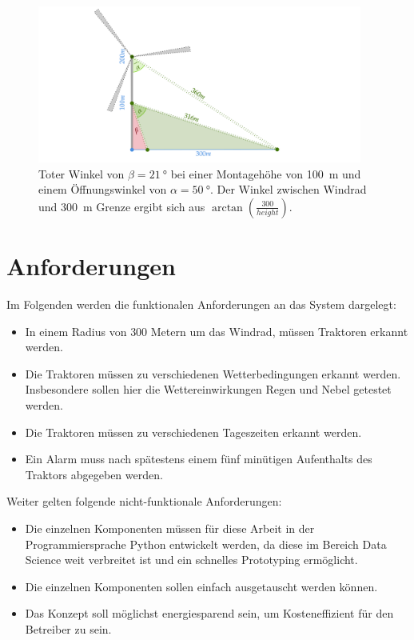 \begin{figure}[ht]
    \begin{small}
        \begin{center}
            \includegraphics[width=0.95\textwidth]{figures/camera/vertical.png}
        \end{center}
        \caption[Toter Winkel bei verschiedenen Montagehöhen]{Toter Winkel von $\beta = \SI{21}{\degree}$ bei einer Montagehöhe von \SI{100}{\metre} und einem Öffnungswinkel von $\alpha = \SI{50}{\degree}$.
        Der Winkel zwischen Windrad und \SI{300}{\metre} Grenze ergibt sich aus $\arctan\left(\frac{300}{height}\right)$.}
        \label{ch4:fig:dead}
    \end{small}
\end{figure}

\section{Anforderungen} \label{ch4:requirements}
Im Folgenden werden die funktionalen Anforderungen an das System dargelegt:
\begin{itemize}
    \item In einem Radius von $300$ Metern um das Windrad, müssen Traktoren erkannt werden.
    \item Die Traktoren müssen zu verschiedenen Wetterbedingungen erkannt werden.
        Insbesondere sollen hier die Wettereinwirkungen Regen und Nebel getestet werden.
    \item Die Traktoren müssen zu verschiedenen Tageszeiten erkannt werden.
    \item Ein Alarm muss nach spätestens einem fünf minütigen Aufenthalts des Traktors abgegeben werden.
\end{itemize}

Weiter gelten folgende nicht-funktionale Anforderungen:
\begin{itemize}
    \item Die einzelnen Komponenten müssen für diese Arbeit in der Programmiersprache Python entwickelt werden, da diese im Bereich Data Science weit verbreitet ist und ein schnelles Prototyping ermöglicht.
    \item Die einzelnen Komponenten sollen einfach ausgetauscht werden können.
    \item Das Konzept soll möglichst energiesparend sein, um Kosteneffizient für den Betreiber zu sein.
\end{itemize}


